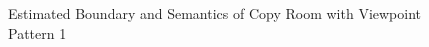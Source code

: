 \documentclass[11pt, a4paper,oneside,chapterprefix=false]{scrbook}
\begin{document}
\vspace{40pt}

\begin{figure}[H]
    \centering
      \label{fig:copy b 200 0} \hfill
     \label{fig:copy s 200 0}
    \caption{Estimated Boundary and Semantics of Copy Room with Viewpoint Pattern 1}
    \label{fig:copy 0}
\end{figure}

\vspace{30pt}
\end{document}
